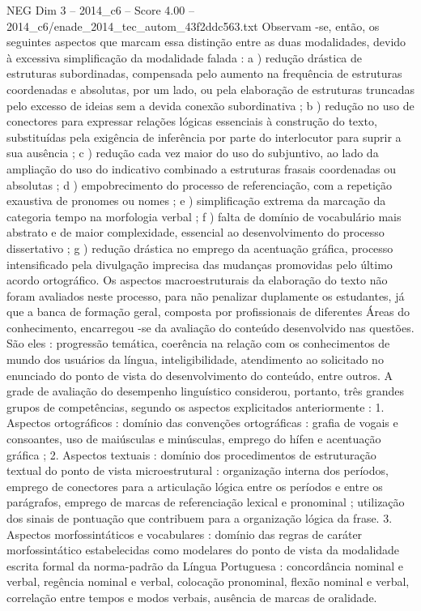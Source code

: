 \begin{textsample}{NEG Dim 3 – 2014\_c6 – Score 4.00 – 2014\_c6/enade\_2014\_tec\_autom\_43f2ddc563.txt}
Observam -se, então, os seguintes aspectos que marcam essa distinção entre as duas modalidades, devido à excessiva simplificação da modalidade falada : a ) redução drástica de estruturas subordinadas, compensada pelo aumento na frequência de estruturas coordenadas e absolutas, por um lado, ou pela elaboração de estruturas truncadas pelo excesso de ideias sem a devida conexão subordinativa ; b ) redução no uso de conectores para expressar relações lógicas essenciais à construção do texto, substituídas pela exigência de inferência por parte do interlocutor para suprir a sua ausência ; c ) redução cada vez maior do uso do subjuntivo, ao lado da ampliação do uso do indicativo combinado a estruturas frasais coordenadas ou absolutas ; d ) empobrecimento do processo de referenciação, com a repetição exaustiva de pronomes ou nomes ; e ) simplificação extrema da marcação da categoria tempo na morfologia verbal ; f ) falta de domínio de vocabulário mais abstrato e de maior complexidade, essencial ao desenvolvimento do processo dissertativo ; g ) redução drástica no emprego da acentuação gráfica, processo intensificado pela divulgação imprecisa das mudanças promovidas pelo último acordo ortográfico.
Os aspectos macroestruturais da elaboração do texto não foram avaliados neste processo, para não penalizar duplamente os estudantes, já que a banca de formação geral, composta por profissionais de diferentes Áreas do conhecimento, encarregou -se da avaliação do conteúdo desenvolvido nas questões.
São eles : progressão temática, coerência na relação com os conhecimentos de mundo dos usuários da língua, inteligibilidade, atendimento ao solicitado no enunciado do ponto de vista do desenvolvimento do conteúdo, entre outros.
A grade de avaliação do desempenho linguístico considerou, portanto, três grandes grupos de competências, segundo os aspectos explicitados anteriormente : 1.
Aspectos ortográficos : domínio das convenções ortográficas : grafia de vogais e consoantes, uso de maiúsculas e minúsculas, emprego do hífen e acentuação gráfica ; 2.
Aspectos textuais : domínio dos procedimentos de estruturação textual do ponto de vista microestrutural : organização interna dos períodos, emprego de conectores para a articulação lógica entre os períodos e entre os parágrafos, emprego de marcas de referenciação lexical e pronominal ; utilização dos sinais de pontuação que contribuem para a organização lógica da frase. 3.
Aspectos morfossintáticos e vocabulares : domínio das regras de caráter morfossintático estabelecidas como modelares do ponto de vista da modalidade escrita formal da norma-padrão da Língua Portuguesa : concordância nominal e verbal, regência nominal e verbal, colocação pronominal, flexão nominal e verbal, correlação entre tempos e modos verbais, ausência de marcas de oralidade.

\end{textsample}
